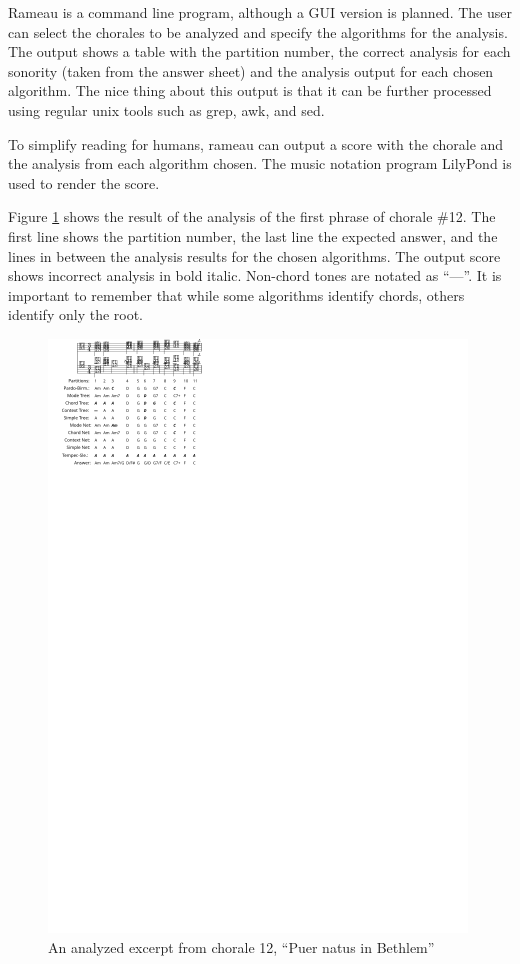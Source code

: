 \documentclass{article}
\begin{document}
Rameau is a command line program, although a GUI version is planned.
The user can select the chorales to be analyzed and specify the
algorithms for the analysis. The output shows a table with the
partition number, the correct analysis for each sonority (taken from
the answer sheet) and the analysis output for each chosen algorithm.
The nice thing about this output is that it can be further processed
using regular unix tools such as grep, awk, and sed.

To simplify reading for humans, rameau can output a score with the
chorale and the analysis from each algorithm chosen. The music
notation program LilyPond \cite{nienhuys.ea:lilypond} is used to
render the score.

Figure \ref{fig:coral-12} shows the result of the analysis of the
first phrase of chorale \#12. The first line shows the partition
number, the last line the expected answer, and the lines in between
the analysis results for the chosen algorithms. The output score shows
incorrect analysis in bold italic. Non-chord tones are notated as
``—''. It is important to remember that while some algorithms identify
chords, others identify only the root.

\begin{figure}
  \centering
  \includegraphics[scale=4]{coral-012}
  \caption{An analyzed excerpt from chorale 12, ``Puer natus in Bethlem''}
  \label{fig:coral-12}
\end{figure}
\end{document}
